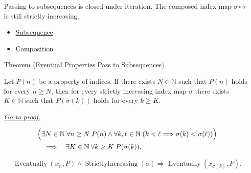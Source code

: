 \begin{remark*}[Interpretation]
Passing to subsequences is closed under iteration. The composed index map
$\sigma\circ\tau$ is still strictly increasing.
\end{remark*}

\begin{dependencies}
\begin{itemize}
  \item \hyperref[def:subsequence]{Subsequence}
  \item \hyperref[def:composition]{Composition}
\end{itemize}
\end{dependencies}


\begin{theorembox}{Theorem (Eventual Properties Pass to Subsequences)}
\begin{theorem}
\label{thm:eventual-properties-pass-to-subsequences}
Let $P(n)$ be a property of indices. If there exists $N\in\mathbb{N}$ such
that $P(n)$ holds for every $n\ge N$, then for every strictly increasing
index map $\sigma$ there exists $K\in\mathbb{N}$ such that $P(\sigma(k))$
holds for every $k\ge K$.

\smallskip
\noindent
\hyperref[prf:eventual-properties-pass-to-subsequences]{\textit{Go to proof.}}
\end{theorem}
\end{theorembox}

\begin{remark*}
\[
\begin{aligned}
&\Bigl(
  \exists N\in\mathbb{N}\;\forall n\ge N\;P(n)
  \land
  \forall k,\ell\in\mathbb{N}\;(k<\ell\Longrightarrow\sigma(k)<\sigma(\ell))
\Bigr)\\
&\quad\Longrightarrow\quad
\exists K\in\mathbb{N}\;\forall k\ge K\;P(\sigma(k)).
\end{aligned}
\]
\end{remark*}

\begin{remark*}
\[
\operatorname{Eventually}(x_n,P)
\land
\operatorname{StrictlyIncreasing}(\sigma)
\Longrightarrow
\operatorname{Eventually}(x_{\sigma(k)},P).
\]
\end{remark*}

